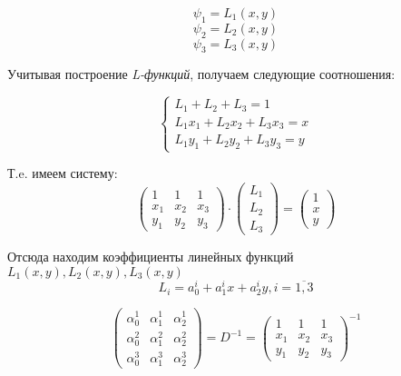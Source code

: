 \documentclass[12pt,a4paper]{article}
\begin{document}
\[ \psi_1 = L_1(x,y) \]
\[ \psi_2 = L_2(x,y) \]
\[ \psi_3 = L_3(x,y) \]

\noindent Учитывая построение \textit{L-функций},
получаем следующие соотношения:

\begin{equation*}
    \begin{cases}
        L_1 + L_2 + L_3 = 1          \\
        L_1x_1 + L_2x_2 + L_3x_3 = x \\
        L_1y_1 + L_2y_2 + L_3y_3 = y
    \end{cases}
\end{equation*}

\noindent Т.e. имеем систему:
\renewcommand{\arraystretch}{1.25}
\begin{equation*}
    \begin{pmatrix}
        1   & 1   & 1   \\
        x_1 & x_2 & x_3 \\
        y_1 & y_2 & y_3
    \end{pmatrix}
    \cdot
    \begin{pmatrix}
        L_1 \\
        L_2 \\
        L_3
    \end{pmatrix}
    =
    \begin{pmatrix}
        1 \\
        x \\
        y
    \end{pmatrix}
\end{equation*}
\renewcommand{\arraystretch}{1.0}

\noindent Отсюда находим коэффициенты
линейных функций $L_1(x,y), L_2(x,y), L_3(x,y)$
\[ L_i = a_0^i + a_1^ix + a_2^iy, i = \overline{1,3} \]

\renewcommand{\arraystretch}{1.25}
\begin{equation*}
    \begin{pmatrix}
        \alpha_0^1 & \alpha_1^1 & \alpha_2^1 \\
        \alpha_0^2 & \alpha_1^2 & \alpha_2^2 \\
        \alpha_0^3 & \alpha_1^3 & \alpha_2^3
    \end{pmatrix}
    =
    D^{-1}
    =
    {\begin{pmatrix}
        1   & 1   & 1   \\
        x_1 & x_2 & x_3 \\
        y_1 & y_2 & y_3
    \end{pmatrix}}^{-1}
\end{equation*}
\renewcommand{\arraystretch}{1.0}
\end{document}
